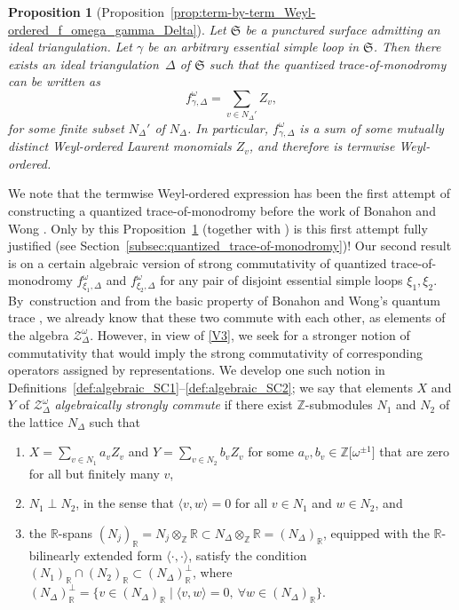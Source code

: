 \documentclass[pdftex]{sigma}
\numberwithin{equation}{section}
\newtheorem{Proposition}[Theorem]{Proposition}
\theoremstyle{definition}
\begin{document}
\begin{Proposition}[Proposition~\ref{prop:term-by-term_Weyl-ordered_f_omega_gamma_Delta}]
\label{prop:intro_term-by-term}
Let $\mathfrak{S}$ be a punctured surface admitting an ideal triangulation. Let $\gamma$ be an arbitrary essential simple loop in $\mathfrak{S}$. Then there exists an ideal triangulation~$\Delta$ of $\mathfrak{S}$ such that the quantized trace-of-monodromy can be written as
\[
f^\omega_{\gamma,\Delta} = \sum_{v\in N_\Delta'} Z_v,
\]
for some finite subset $N_\Delta'$ of $N_\Delta$. In particular, $f^\omega_{\gamma,\Delta}$ is a sum of some mutually distinct Weyl-ordered Laurent monomials $Z_v$, and therefore is termwise Weyl-ordered.
\end{Proposition}
We note that the termwise Weyl-ordered expression has been the first attempt of constructing a quantized trace-of-monodromy \cite{F97, CF2} before the work of Bonahon and Wong \cite{BW}. Only by this Proposition~\ref{prop:intro_term-by-term} (together with \cite{BW}) is this first attempt fully justified (see Section~\ref{subsec:quantized_trace-of-monodromy})!
Our second result is on a certain algebraic version of strong commutativity of quantized trace-of-monodromy $f^\omega_{\xi_1,\Delta}$ and $f^\omega_{\xi_2,\Delta}$ for any pair of disjoint essential simple loops $\xi_1,\xi_2$. By~construction and from the basic property of Bonahon and Wong's quantum trace \cite{BW}, we already know that these two commute with each other, as elements of the algebra $\mathcal{Z}^\omega_\Delta$. However, in view of \ref{V3}, we seek for a stronger notion of commutativity that would imply the strong commutativity of corresponding operators assigned by representations. We develop one such notion in Definitions~\ref{def:algebraic_SC1}--\ref{def:algebraic_SC2}; we say that elements $X$ and $Y$ of $\mathcal{Z}^\omega_\Delta$ {\em algebraically strongly commute} if there exist $\mathbb{Z}$-submodules $N_1$ and $N_2$ of the lattice $N_\Delta$ such that
\begin{enumerate}[label={\rm (\arabic*)}]\itemsep=0pt
\item $X = \sum_{v\in N_1} a_v Z_v$ and $Y = \sum_{v\in N_2} b_v Z_v$ for some $a_v,b_v \in \mathbb{Z}\bigl[\omega^{\pm 1}\bigr]$ that are zero for all but finitely many $v$,
\item $N_1 \perp N_2$, in the sense that $\langle v,w\rangle=0$ for all $v\in N_1$ and $w\in N_2$, and
\item the $\mathbb{R}$-spans $(N_j)_\mathbb{R} = N_j \otimes_\mathbb{Z} \mathbb{R} \subset N_\Delta \otimes_\mathbb{Z} \mathbb{R} = (N_\Delta)_\mathbb{R}$, equipped with the $\mathbb{R}$-bilinearly extended form $\langle \cdot,\cdot\rangle$, satisfy the condition $(N_1)_\mathbb{R} \cap (N_2)_\mathbb{R} \subset (N_\Delta)_\mathbb{R}^\perp$, where $(N_\Delta)_\mathbb{R}^\perp = \bigl\{ v\in (N_\Delta)_\mathbb{R} \mid \langle v,w\rangle=0, ~ \forall w\in (N_\Delta)_\mathbb{R}\bigr\}$.
\end{enumerate}
\end{document}
